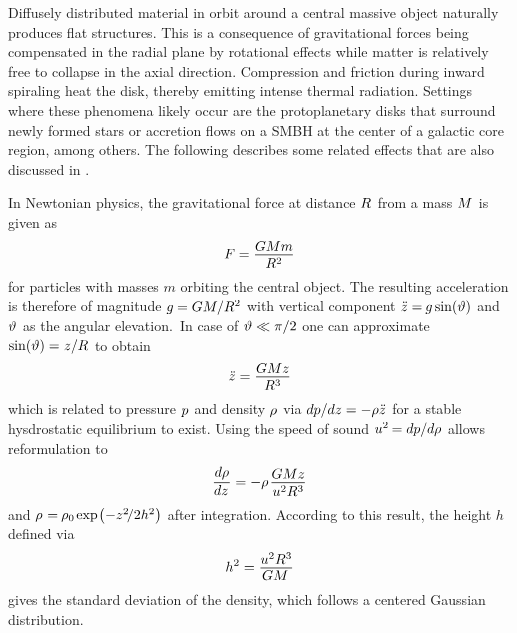 Diffusely distributed material in orbit around a central massive object naturally produces flat structures. This is a
consequence of gravitational forces being compensated in the radial plane by rotational effects while matter is relatively
free to collapse in the axial direction. Compression and friction during inward spiraling heat the disk, thereby emitting
intense thermal radiation. Settings where these phenomena likely occur are the protoplanetary disks that surround newly formed
stars or accretion flows on a SMBH at the center of a galactic core region, among others. The following describes some related effects
that are also discussed in \cite{Longair_2011}.

In Newtonian physics, the gravitational force at distance $R \kern+0.5pt$ from a mass $M \kern+0.5pt$ is given as
\begin{equation}
	F = \frac{\raisebox{-0.3ex}{$GMm$}}{R^2}
	\label{eqn:newton}
\end{equation}
for particles with masses $m$ orbiting the central object. The resulting acceleration is therefore of magnitude
$g \kern-0.3pt = GM / \smash{R^2}$ with vertical component $\ddot{z} = \kern-0.6pt g \sin(\vartheta)$ and
$\vartheta \kern+0.5pt$ as the angular elevation.~In case of $\kern+0.5pt \vartheta \ll \pi / 2$ one can approximate
$\sin(\vartheta) = \kern+0.3pt z / \kern-0.2pt R \kern+0.5pt$ to obtain
\begin{equation*}
	\ddot{z} = \frac{\raisebox{-0.3ex}{$GMz$}}{R^3}
\end{equation*}
which is related to pressure $p \kern+0.5pt$ and density $\kern-0.5pt \rho \kern+0.5pt$ via
$d \kern-0.1pt p / \kern-0.1pt dz = -\rho \ddot{z} \kern+0.5pt$ for a stable hysdrostatic equilibrium to exist. Using the speed
of sound $\smash{u^2} \kern-0.7pt = d \kern-0.1pt p / \kern-0.1pt d \kern-0.1pt \rho \kern+0.5pt$ allows reformulation to
\begin{equation*}
	\frac{d \kern-0.1pt \rho}{\raisebox{0.2ex}{$dz \kern+1.0pt$}} =
	-\rho \kern+1.0pt \frac{\raisebox{-0.3ex}{$GMz$}}{u^2R^3}
\end{equation*}
and $\rho \kern+0.6pt = \kern-0.6pt \rho_0 \kern-0.5pt \exp \kern-1.0pt \smash{\bigl( -z^2 \kern-1.8pt / 2 h^2 \bigr)}$
after integration. According to this result, the height $h$ defined via
\begin{equation}
	h^2 = \frac{\raisebox{-0.3ex}{$u^2R^3$}}{\raisebox{0.2ex}{$GM \kern+1.5pt$}}
	\label{eqn:height}
\end{equation}
gives the standard deviation of the density, which follows a centered Gaussian distribution.

